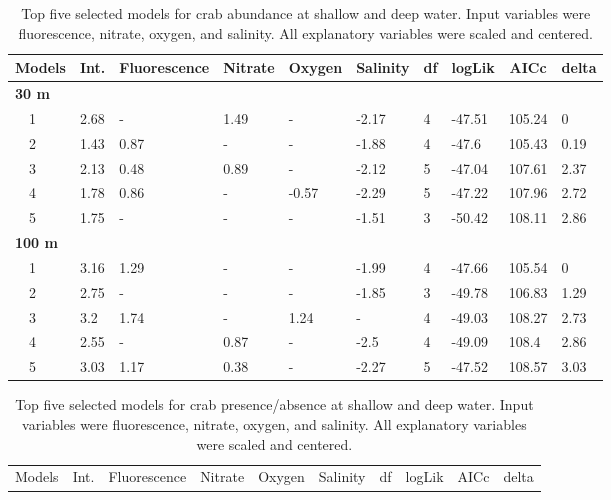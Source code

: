 \documentclass[letterpaper,12pt]{article}\usepackage[]{graphicx}\usepackage[]{color}
\begin{document}
\begin{landscape}
\centering\vspace*{\fill}
\begin{table}[!tbp]
{\scriptsize
\caption{Top five selected models for crab abundance at shallow and deep water. Input variables were fluorescence, nitrate, oxygen, and salinity. All explanatory variables were scaled and centered.\label{tab:abutab}} 
\begin{center}
\begin{tabular}{llllllllll}
\hline\hline
\multicolumn{1}{l}{Models}&\multicolumn{1}{c}{Int.}&\multicolumn{1}{c}{Fluorescence}&\multicolumn{1}{c}{Nitrate}&\multicolumn{1}{c}{Oxygen}&\multicolumn{1}{c}{Salinity}&\multicolumn{1}{c}{df}&\multicolumn{1}{c}{logLik}&\multicolumn{1}{c}{AICc}&\multicolumn{1}{c}{delta}\tabularnewline
\hline
{\bfseries 30 m}&&&&&&&&&\tabularnewline
~~1&2.68&-&1.49&-&-2.17&4&-47.51&105.24&0\tabularnewline
~~2&1.43&0.87&-&-&-1.88&4&-47.6&105.43&0.19\tabularnewline
~~3&2.13&0.48&0.89&-&-2.12&5&-47.04&107.61&2.37\tabularnewline
~~4&1.78&0.86&-&-0.57&-2.29&5&-47.22&107.96&2.72\tabularnewline
~~5&1.75&-&-&-&-1.51&3&-50.42&108.11&2.86\tabularnewline
\hline
{\bfseries 100 m}&&&&&&&&&\tabularnewline
~~1&3.16&1.29&-&-&-1.99&4&-47.66&105.54&0\tabularnewline
~~2&2.75&-&-&-&-1.85&3&-49.78&106.83&1.29\tabularnewline
~~3&3.2&1.74&-&1.24&-&4&-49.03&108.27&2.73\tabularnewline
~~4&2.55&-&0.87&-&-2.5&4&-49.09&108.4&2.86\tabularnewline
~~5&3.03&1.17&0.38&-&-2.27&5&-47.52&108.57&3.03\tabularnewline
\hline
\end{tabular}\end{center}}
\end{table}
\begin{table}[!tbp]
{\scriptsize
\caption{Top five selected models for crab presence/absence at shallow and deep water. Input variables were fluorescence, nitrate, oxygen, and salinity. All explanatory variables were scaled and centered.\label{tab:patab}} 
\begin{center}
\begin{tabular}{llllllllll}
\hline\hline
\multicolumn{1}{l}{Models}&\multicolumn{1}{c}{Int.}&\multicolumn{1}{c}{Fluorescence}&\multicolumn{1}{c}{Nitrate}&\multicolumn{1}{c}{Oxygen}&\multicolumn{1}{c}{Salinity}&\multicolumn{1}{c}{df}&\multicolumn{1}{c}{logLik}&\multicolumn{1}{c}{AICc}&\multicolumn{1}{c}{delta}\tabularnewline

\end{tabular}
\end{center}}
\end{table}
\end{landscape}
\end{document}
